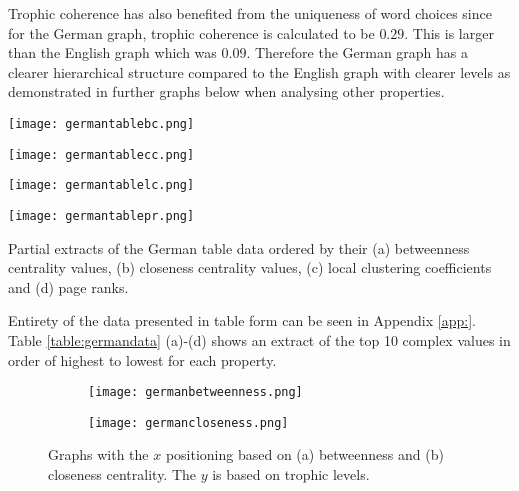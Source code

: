 Trophic coherence has also benefited from the uniqueness of word choices since for the German graph, trophic coherence is calculated to be $0.29$. This is larger than the English graph which was $0.09$. Therefore the German graph has a clearer hierarchical structure compared to the English graph with clearer levels as demonstrated in further graphs below when analysing other properties.

\begin{table}[H]
\centering
\begin{subtable}{.2\textwidth}
	\centering
	\texttt{[image: germantablebc.png]}
	\caption{}
	\label{table:germantablebc}
\end{subtable}
\hfill
\begin{subtable}{.2\textwidth}
	\centering
	\texttt{[image: germantablecc.png]}
	\caption{}
	\label{table:germantablecc}
\end{subtable}
\hfill
\begin{subtable}{.2\textwidth}
	\centering
	\texttt{[image: germantablelc.png]}
	\caption{}
	\label{table:germantablelc}
\end{subtable}
\hfill
\begin{subtable}{.2\textwidth}
	\centering
	\texttt{[image: germantablepr.png]}
	\caption{}
	\label{table:germantablepr}
\end{subtable}
\caption{Partial extracts of the German table data ordered by their (a) betweenness centrality values, (b) closeness centrality values, (c) local clustering coefficients and (d) page ranks.}
\label{table:germandata}
\end{table}

Entirety of the data presented in table form can be seen in Appendix \ref{app:}. Table \ref{table:germandata} (a)-(d) shows an extract of the top 10 complex values in order of highest to lowest for each property.

\begin{figure}[H]
\centering
\begin{subfigure}{.45\textwidth}
	\hspace{-1cm} 
	\texttt{[image: germanbetweenness.png]}
	\caption{}
	\label{fig:gerbc}
\end{subfigure}
\hfill
\begin{subfigure}{.45\textwidth}
	\hspace{-1cm} 
	\texttt{[image: germancloseness.png]}
	\caption{ }
	\label{fig:gercc}
\end{subfigure}
\caption{Graphs with the $x$ positioning based on (a) betweenness and (b) closeness centrality. The $y$ is based on trophic levels.}
\label{fig:gercentrality}
\end{figure}

